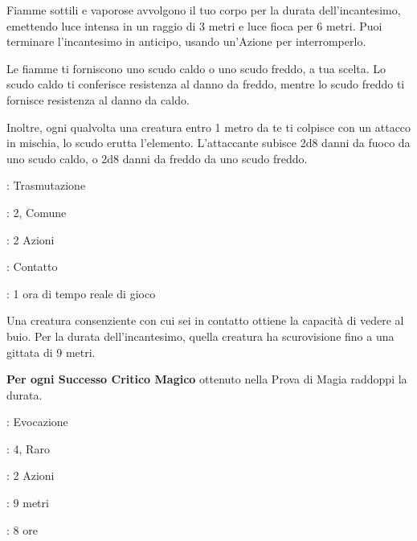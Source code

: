\begin{multicols}{2}
Fiamme sottili e vaporose avvolgono il tuo corpo per la durata dell'incantesimo, emettendo luce intensa in un raggio di 3 metri e luce fioca per 6 metri. Puoi terminare l'incantesimo in anticipo, usando un'Azione per interromperlo.

Le fiamme ti forniscono uno scudo caldo o uno scudo freddo, a tua scelta. Lo scudo caldo ti conferisce resistenza al danno da freddo, mentre lo scudo freddo ti fornisce resistenza al danno da caldo.

Inoltre, ogni qualvolta una creatura entro 1 metro da te ti colpisce con un attacco in mischia, lo scudo erutta l'elemento. L'attaccante subisce 2d8 danni da fuoco da uno scudo caldo, o 2d8 danni da freddo da uno scudo freddo.

\noindent\colorbox{OBSSgold!10}{
\begin{minipage}{0.95\linewidth}
\begin{description}[noitemsep, topsep=0pt, parsep=0pt, partopsep=0pt, leftmargin=0cm, labelwidth=1.3cm]
	\item[\textbf{Lista}]: Trasmutazione
	\item[\textbf{Livello}]: 2, Comune
	\item[\textbf{Lancio}]: 2 Azioni
	\item[\textbf{Gittata}]: Contatto
	\item[\textbf{Durata}]: 1 ora di tempo reale di gioco
\end{description}
\end{minipage}}\smallskip

Una creatura consenziente con cui sei in contatto ottiene la capacità di vedere al buio. Per la durata dell'incantesimo, quella creatura ha scurovisione fino a una gittata di 9 metri.

\textbf{Per ogni Successo Critico Magico} ottenuto nella Prova di Magia raddoppi la durata.

\noindent\colorbox{OBSSgold!10}{
\begin{minipage}{0.95\linewidth}
\begin{description}[noitemsep, topsep=0pt, parsep=0pt, partopsep=0pt, leftmargin=0cm, labelwidth=1.3cm]
	\item[\textbf{Lista}]: Evocazione
	\item[\textbf{Livello}]: 4, Raro
	\item[\textbf{Lancio}]: 2 Azioni
	\item[\textbf{Gittata}]: 9 metri
	\item[\textbf{Durata}]: 8 ore
\end{description}
\end{minipage}}\smallskip


\end{multicols}

